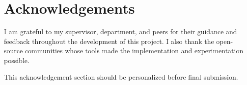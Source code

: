 \chapter*{Acknowledgements}

I am grateful to my supervisor, department, and peers for their guidance and feedback throughout the development of this project. I also thank the open-source communities whose tools made the implementation and experimentation possible.

This acknowledgement section should be personalized before final submission.
